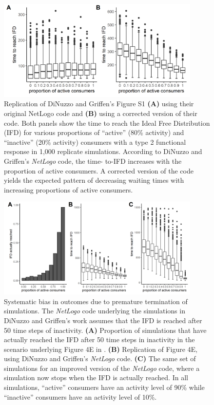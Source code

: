 \begin{interludeenv}
	\begin{figure}[!h]
		\centering
		\includegraphics[width=0.9\textwidth]{figures/boxes/details1.png}
		\caption{
			Replication of DiNuzzo and Griffen's Figure S1 \textbf{(A)} using their original NetLogo code and \textbf{(B)} using a corrected version of their code. 
			Both panels show the time to reach the Ideal Free Distribution (IFD) for various proportions of ``active'' (80\% activity) and ``inactive'' (20\% activity) consumers with a type 2 functional response in 1,000 replicate simulations. 
			According to DiNuzzo and Griffen's \textit{NetLogo} code, the time- to-IFD increases with the proportion of active consumers. 
			A corrected version of the code yields the expected pattern of decreasing waiting times with increasing proportions of active consumers.
		}\label{fig_details_01}
	\end{figure}

	\begin{figure}[!h]
		\centering
		\includegraphics[width=0.9\textwidth]{figures/boxes/details2.png}
		\caption{
			Systematic bias in outcomes due to premature termination of simulations. 
			The \textit{NetLogo} code underlying the simulations in DiNuzzo and Griffen's work assumes that the IFD is reached after 50 time steps of inactivity. 
			\textbf{(A)} Proportion of simulations that have actually reached the IFD after 50 time steps in inactivity in the scenario underlying Figure 4E in \citet{dinuzzo2020}. 
			\textbf{(B)} Replication of Figure 4E, using DiNuzzo and Griffen's \textit{NetLogo} code. 
			\textbf{(C)} The same set of simulations for an improved version of the \textit{NetLogo} code, where a simulation now stops when the IFD is actually reached. 
			In all simulations, ``active'' consumers have an activity level of 90\% while ``inactive'' consumers have an activity level of 10\%.
		}\label{fig_details_02}
	\end{figure}


\end{interludeenv}
